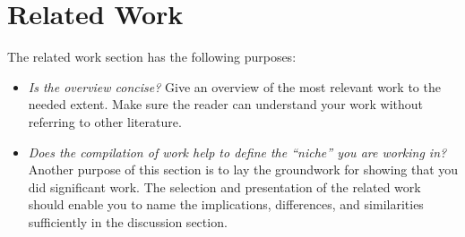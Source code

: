 %

\newpage
\chapter{Related Work}

The related work section has the following purposes: 

\begin{itemize}
 \item \textit{Is the overview concise?} Give an overview of the most relevant work to the needed extent. Make sure the reader can understand your work without referring to other literature.
 \item \textit{Does the compilation of work help to define the ``niche'' you are working in?} Another purpose of this section is to lay the groundwork for showing that you did significant work. The selection and presentation of the related work should enable you to name the implications, differences, and similarities sufficiently in the discussion section.
\end{itemize}


